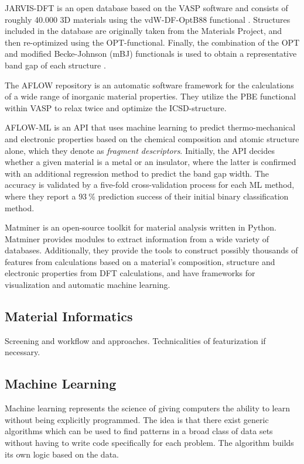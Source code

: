 \documentclass[superscriptaddress,unsortedaddress,
 amsmath,amssymb,
 aps,
]{revtex4-2}
\begin{document}
JARVIS-DFT \cite{Choudhary2020} is an open database based on the VASP software and consists of roughly 40.000 3D materials using the vdW-DF-OptB88 functional \cite{Thonhauser2007, Klimes2011}. Structures included in the database are originally taken from the Materials Project, and then re-optimized using the OPT-functional. Finally, the combination of the OPT and modified Becke-Johnson (mBJ) functionals is used to obtain a representative band gap of each structure \cite{Choudhary2018a}. 

The AFLOW \cite{Curtarolo2012, Curtarolo2012a, Calderon2015} repository is an automatic software framework for the calculations of a wide range of inorganic material properties. They utilize the PBE functional within VASP
to relax twice and optimize the ICSD-structure. 

AFLOW-ML \cite{Isayev2017} is an API that uses machine learning to predict thermo-mechanical and electronic properties based on the chemical composition and atomic structure alone, which they denote as \textit{fragment descriptors}. Initially, the API decides whether a given material is a metal or an insulator, where the latter is confirmed with an additional regression method to predict the band gap width. The accuracy is validated by a five-fold cross-validation process for each ML method, where they report a $93 \ \%$ prediction success of their initial binary classification method. 

Matminer \cite{Ward2018} is an open-source toolkit for material analysis written in Python. Matminer provides modules to extract information from a wide variety of databases. Additionally, they provide the tools to construct possibly thousands of features from calculations based on a material's composition, structure and electronic properties from DFT calculations, and have frameworks for visualization and automatic machine learning.

\subsection*{Material Informatics}  
Screening and workflow and approaches. Technicalities of featurization if necessary. 

\subsection*{Machine Learning} 

Machine learning  represents the science of giving computers the ability to learn without being explicitly programmed. The idea is that there exist generic algorithms which can be used to find patterns in a broad class of data sets without having to write code specifically for each problem. The algorithm builds its own logic based on the data. 
\end{document}
